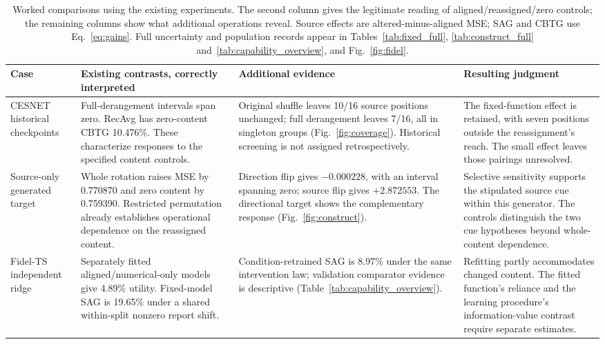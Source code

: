 \begin{table}[!ht]
\centering\small
\setlength{\tabcolsep}{3pt}
\renewcommand{\arraystretch}{1.12}
\caption{Worked comparisons using the existing experiments. The second column gives the legitimate reading of aligned/reassigned/zero controls; the remaining columns show what additional operations reveal. Source effects are altered-minus-aligned MSE; SAG and CBTG use Eq.~\ref{eq:gains}. Full uncertainty and population records appear in Tables~\ref{tab:fixed_full}, \ref{tab:construct_full} and~\ref{tab:capability_overview}, and Fig.~\ref{fig:fidel}.}
\label{tab:protocol_worked}
\begin{tabular}{@{}>{\raggedright\arraybackslash}p{}>{\raggedright\arraybackslash}p{}>{\raggedright\arraybackslash}p{}>{\raggedright\arraybackslash}p{}@{}}
\toprule
Case & Existing contrasts, correctly interpreted & Additional evidence & Resulting judgment\\
\midrule
CESNET historical checkpoints & Full-derangement intervals span zero. RecAvg has zero-content CBTG 10.476\%. These characterize responses to the specified content controls. & Original shuffle leaves 10/16 source positions unchanged; full derangement leaves 7/16, all in singleton groups (Fig.~\ref{fig:coverage}). Historical screening is not assigned retrospectively. & The fixed-function effect is retained, with seven positions outside the reassignment's reach. The small effect leaves those pairings unresolved.\\
Source-only generated target & Whole rotation raises MSE by 0.770870 and zero content by 0.759390. Restricted permutation already establishes operational dependence on the reassigned content. & Direction flip gives $-0.000228$, with an interval spanning zero; source flip gives $+2.872553$. The directional target shows the complementary response (Fig.~\ref{fig:construct}). & Selective sensitivity supports the stipulated source cue within this generator. The controls distinguish the two cue hypotheses beyond whole-content dependence.\\
Fidel-TS independent ridge & Separately fitted aligned/numerical-only models give 4.89\% utility. Fixed-model SAG is 19.65\% under a shared within-split nonzero report shift. & Condition-retrained SAG is 8.97\% under the same intervention law; validation comparator evidence is descriptive (Table~\ref{tab:capability_overview}). & Refitting partly accommodates changed content. The fitted function's reliance and the learning procedure's information-value contrast require separate estimates.\\
\bottomrule
\end{tabular}
\end{table}
